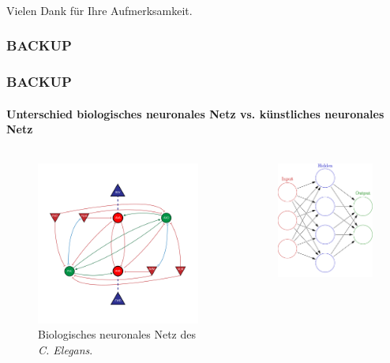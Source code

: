 \documentclass[10pt,t,aspectratio=1610]{beamer}
\newcommand{\ChapterBackup}{BACKUP}
\begin{document}

\begin{frame}[c]
	\frametitle{}
	\centering
	{\LARGE Vielen Dank für Ihre Aufmerksamkeit.}

\end{frame}


\ClosingSlide


\begin{frame}[c]
\frametitle{\ChapterBackup}
\centering
{\Large {}}

\end{frame}


\begin{frame}[c]
\frametitle{\ChapterBackup}
\framesubtitle{Unterschied biologisches neuronales Netz vs. künstliches neuronales Netz}
\vspace{-0.5cm}
\begin{columns}[T,onlytextwidth]
	\begin{column}{0.4\textwidth}
		\begin{figure}[H] %
			\centering
			\includegraphics[width=6.5cm]{figures/Neural_Net_v3_ohneLegende.pdf}
			\caption{Biologisches neuronales Netz des \textit{C. Elegans}.}
			\label{fig:bnn_celegans}
		\end{figure}
	\end{column}
	\hspace{-1cm}
	\begin{column}{0.5\textwidth}
		\vspace{1.1cm}
		\begin{figure}[H] %
			\centering
			\includegraphics[width=4.5cm]{figures/Colored_neural_network.pdf}

\end{figure}
\end{column}
\end{columns}
\end{frame}
\end{document}
